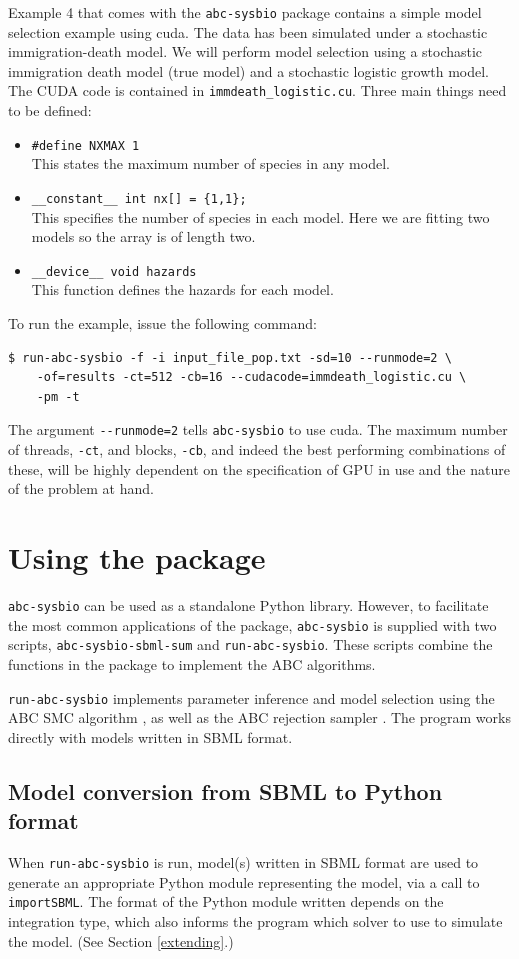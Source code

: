 \documentclass[a4paper]{report}
\begin{document}
Example 4 that comes with the \verb$abc-sysbio$ package contains a simple model selection example using cuda. The data has been simulated under a stochastic immigration-death model. We will perform model selection using a stochastic immigration death model (true model) and a stochastic logistic growth model. The CUDA code is contained in \verb$immdeath_logistic.cu$. Three main things need to be defined:
\begin{itemize}
\item \verb$#define NXMAX 1$ \\
This states the maximum number of species in any model.
\item \verb$__constant__ int nx[] = {1,1};$\\
This specifies the number of species in each model. Here we are fitting two models so the array is of length two.  
\item
\verb$__device__ void hazards$ \\
This function defines the hazards for each model.
\end{itemize}
To run the example, issue the following command:
\begin{verbatim}
$ run-abc-sysbio -f -i input_file_pop.txt -sd=10 --runmode=2 \
	-of=results -ct=512 -cb=16 --cudacode=immdeath_logistic.cu \
	-pm -t
\end{verbatim}

The argument \verb$--runmode=2$ tells \verb$abc-sysbio$ to use cuda.
The maximum number of threads, \verb$-ct$, and blocks,  \verb$-cb$, and indeed the best performing combinations of these, will be highly dependent on the specification of GPU in use and the nature of the problem at hand.


\chapter{Using the package}
\label{usage}
\verb$abc-sysbio$ can be used as a standalone Python library. However, to facilitate the most common applications of the package, \verb$abc-sysbio$ is supplied with two scripts, \verb$abc-sysbio-sbml-sum$ and \verb$run-abc-sysbio$. These scripts combine the functions in the package to implement the ABC algorithms.

\verb$run-abc-sysbio$ implements parameter inference and model selection using the ABC SMC algorithm \citep{Toni2009}, as well as the ABC rejection sampler \citep{ABCrejection}. The program works directly with models written in SBML format. 
\section{Model conversion from SBML to Python format}
When \verb$run-abc-sysbio$ is run, model(s) written in SBML format are used to generate an appropriate Python module representing the model, via a call to \verb$importSBML$. The format of the Python module written depends on the integration type, which also informs the program which solver to use to simulate the model. (See Section \ref{extending}.)
\end{document}
